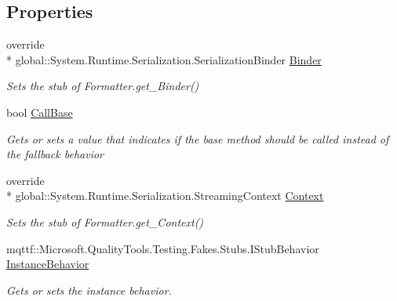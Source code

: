 \subsection*{Properties}
\begin{DoxyCompactItemize}
\item 
override \\*
global\-::\-System.\-Runtime.\-Serialization.\-Serialization\-Binder \hyperlink{class_system_1_1_runtime_1_1_serialization_1_1_fakes_1_1_stub_formatter_a52b8994ef0819dd2e8b00780a33034ff}{Binder}
\begin{DoxyCompactList}\small\item\em Sets the stub of Formatter.\-get\-\_\-\-Binder()\end{DoxyCompactList}\item 
bool \hyperlink{class_system_1_1_runtime_1_1_serialization_1_1_fakes_1_1_stub_formatter_aaf2a534db0395ca37a17c529de3977c5}{Call\-Base}
\begin{DoxyCompactList}\small\item\em Gets or sets a value that indicates if the base method should be called instead of the fallback behavior\end{DoxyCompactList}\item 
override \\*
global\-::\-System.\-Runtime.\-Serialization.\-Streaming\-Context \hyperlink{class_system_1_1_runtime_1_1_serialization_1_1_fakes_1_1_stub_formatter_a9f8367d6940c51e638362a16385e04fd}{Context}
\begin{DoxyCompactList}\small\item\em Sets the stub of Formatter.\-get\-\_\-\-Context()\end{DoxyCompactList}\item 
mqttf\-::\-Microsoft.\-Quality\-Tools.\-Testing.\-Fakes.\-Stubs.\-I\-Stub\-Behavior \hyperlink{class_system_1_1_runtime_1_1_serialization_1_1_fakes_1_1_stub_formatter_a44bd108c1207aea98e8680341d9a414b}{Instance\-Behavior}
\begin{DoxyCompactList}\small\item\em Gets or sets the instance behavior.\end{DoxyCompactList}\item 

\end{DoxyCompactItemize}
